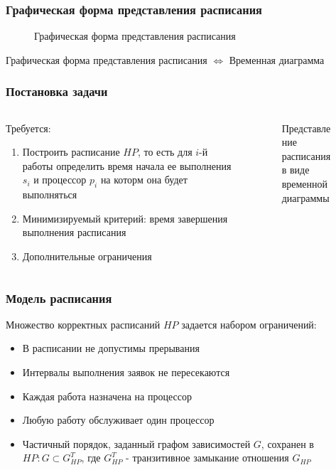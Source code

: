 \begin{frame}
    \frametitle{Графическая форма представления расписания}
    \begin{figure}
        \small
        \captionsetup{labelformat=empty}
        \caption{\small Графическая форма представления расписания}
    \end{figure}
    Графическая форма представления расписания $\Leftrightarrow$ Временная диаграмма
\end{frame}

\begin{frame}
    \frametitle{Постановка задачи}
    \begin{columns}
        \begin{column}{0.7\textwidth}
            Требуется:
            \begin{enumerate}
                \item Построить расписание $HP$, то есть для $i$-й работы определить время начала ее выполнения $s_i$ и процессор $p_i$ на которм она будет выполняться
                \item Минимизируемый критерий: время завершения выполнения расписания
                \item Дополнительные ограничения
            \end{enumerate}
        \end{column}
        \begin{column}{0.3\textwidth}
            \begin{figure}
                \tiny
                \captionsetup{labelformat=empty}
                \caption{\small Представление расписания в виде временной диаграммы}
            \end{figure}
        \end{column}
    \end{columns}
\end{frame}

\begin{frame}
    \frametitle{Модель расписания}
    Множество корректных расписаний $HP$ задается набором ограничений:
    \begin{itemize}
        \item В расписании не допустимы прерывания
        \item Интервалы выполнения заявок не пересекаются
        \item Каждая работа назначена на процессор
        \item Любую работу обслуживает один процессор
        \item Частичный порядок, заданный графом зависимостей $G$, сохранен в $HP: G \subset G_{HP}^T$, где $G_{HP}^T$ - транзитивное замыкание отношения $G_{HP}$
    \end{itemize}
\end{frame}

